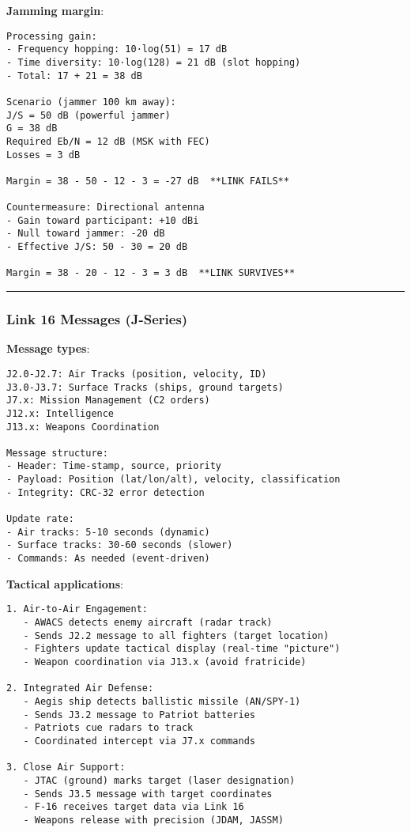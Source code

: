 \textbf{Jamming margin}:

\begin{verbatim}
Processing gain:
- Frequency hopping: 10·log(51) = 17 dB
- Time diversity: 10·log(128) = 21 dB (slot hopping)
- Total: 17 + 21 = 38 dB

Scenario (jammer 100 km away):
J/S = 50 dB (powerful jammer)
G = 38 dB
Required Eb/N = 12 dB (MSK with FEC)
Losses = 3 dB

Margin = 38 - 50 - 12 - 3 = -27 dB  **LINK FAILS**

Countermeasure: Directional antenna
- Gain toward participant: +10 dBi
- Null toward jammer: -20 dB
- Effective J/S: 50 - 30 = 20 dB

Margin = 38 - 20 - 12 - 3 = 3 dB  **LINK SURVIVES**
\end{verbatim}

\begin{center}\rule{0.5\linewidth}{0.5pt}\end{center}

\subsubsection{Link 16 Messages
(J-Series)}\label{link-16-messages-j-series}

\textbf{Message types}:

\begin{verbatim}
J2.0-J2.7: Air Tracks (position, velocity, ID)
J3.0-J3.7: Surface Tracks (ships, ground targets)
J7.x: Mission Management (C2 orders)
J12.x: Intelligence
J13.x: Weapons Coordination

Message structure:
- Header: Time-stamp, source, priority
- Payload: Position (lat/lon/alt), velocity, classification
- Integrity: CRC-32 error detection

Update rate:
- Air tracks: 5-10 seconds (dynamic)
- Surface tracks: 30-60 seconds (slower)
- Commands: As needed (event-driven)
\end{verbatim}

\textbf{Tactical applications}:

\begin{verbatim}
1. Air-to-Air Engagement:
   - AWACS detects enemy aircraft (radar track)
   - Sends J2.2 message to all fighters (target location)
   - Fighters update tactical display (real-time "picture")
   - Weapon coordination via J13.x (avoid fratricide)

2. Integrated Air Defense:
   - Aegis ship detects ballistic missile (AN/SPY-1)
   - Sends J3.2 message to Patriot batteries
   - Patriots cue radars to track
   - Coordinated intercept via J7.x commands

3. Close Air Support:
   - JTAC (ground) marks target (laser designation)
   - Sends J3.5 message with target coordinates
   - F-16 receives target data via Link 16
   - Weapons release with precision (JDAM, JASSM)
\end{verbatim}

